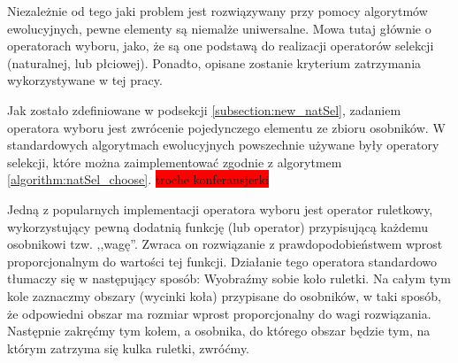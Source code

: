 \documentclass[twoside]{iisthesis}
\newcommand{\todo}{\colorbox{red}}
\begin{document}
Niezależnie od tego jaki problem jest rozwiązywany przy pomocy algorytmów ewolucyjnych, pewne elementy są niemalże uniwersalne. 
Mowa tutaj głównie o operatorach wyboru, jako, że są one podstawą do realizacji operatorów selekcji (naturalnej, lub płciowej).
Ponadto, opisane zostanie kryterium zatrzymania wykorzystywane w tej pracy.

Jak zostało zdefiniowane w podsekcji \ref{subsection:new_natSel}, zadaniem operatora wyboru jest zwrócenie pojedynczego elementu ze zbioru osobników.
W standardowych algorytmach ewolucyjnych powszechnie używane były operatory selekcji, które można zaimplementować zgodnie z algorytmem \ref{algorithm:natSel_choose}.
\todo{troche konferansjerki}

Jedną z popularnych implementacji operatora wyboru jest operator ruletkowy, wykorzystujący pewną dodatnią funkcję (lub operator) przypisującą każdemu osobnikowi tzw. ,,wagę''.
Zwraca on rozwiązanie z prawdopodobieństwem wprost proporcjonalnym do wartości tej funkcji.
Działanie tego operatora standardowo tłumaczy się w następujący sposób:
Wyobraźmy sobie koło ruletki. 
Na całym tym kole zaznaczmy obszary (wycinki koła) przypisane do osobników, w taki sposób, że odpowiedni obszar ma rozmiar wprost proporcjonalny do wagi rozwiązania. 
Następnie zakręćmy tym kołem, a osobnika, do którego obszar będzie tym, na którym zatrzyma się kulka ruletki, zwróćmy.
\end{document}
